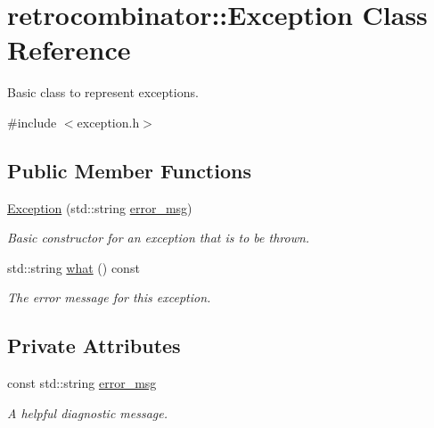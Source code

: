 \hypertarget{classretrocombinator_1_1Exception}{}\section{retrocombinator\+:\+:Exception Class Reference}
\label{classretrocombinator_1_1Exception}


Basic class to represent exceptions.  




{\ttfamily \#include $<$exception.\+h$>$}

\subsection*{Public Member Functions}
\begin{DoxyCompactItemize}
\item 
\hyperlink{classretrocombinator_1_1Exception_a38af9a2c673fc0884cc491e5688ed6b5}{Exception} (std\+::string \hyperlink{classretrocombinator_1_1Exception_ae73ce0ae5fe506beb0c120901c828a84}{error\+\_\+msg})
\begin{DoxyCompactList}\small\item\em Basic constructor for an exception that is to be thrown. \end{DoxyCompactList}\item 
\mbox{\label{classretrocombinator_1_1Exception_ad36da5257be21683372198a37e709c49}} 
std\+::string \hyperlink{classretrocombinator_1_1Exception_ad36da5257be21683372198a37e709c49}{what} () const
\begin{DoxyCompactList}\small\item\em The error message for this exception. \end{DoxyCompactList}\end{DoxyCompactItemize}
\subsection*{Private Attributes}
\begin{DoxyCompactItemize}
\item 
\mbox{\label{classretrocombinator_1_1Exception_ae73ce0ae5fe506beb0c120901c828a84}} 
const std\+::string \hyperlink{classretrocombinator_1_1Exception_ae73ce0ae5fe506beb0c120901c828a84}{error\+\_\+msg}
\begin{DoxyCompactList}\small\item\em A helpful diagnostic message. \end{DoxyCompactList}\end{DoxyCompactItemize}


